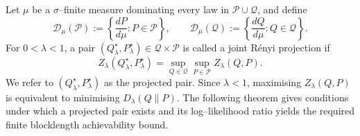 \documentclass[journal,12pt,draftclsnofoot,onecolumn]{IEEEtran}
\begin{document}
Let $\mu$ be a $\sigma$--finite measure dominating every law in $\mathcal P\cup\mathcal Q$, and define
\begin{equation*}
\mathcal D_\mu(\mathcal P) := \left\{\frac{dP}{d\mu}:P\in\mathcal P \right\},\qquad \mathcal D_\mu(\mathcal Q) := \left\{\frac{dQ}{d\mu}:Q\in\mathcal Q \right\}.
\end{equation*}
For $0<\lambda<1$, a pair $(Q_\lambda^\star,P_\lambda^\star)\in\mathcal Q\times\mathcal P$ is called a joint R\'enyi projection if
\begin{equation*}
Z_\lambda(Q_\lambda^\star,P_\lambda^\star) =\sup_{Q\in\mathcal Q} \sup_{P\in\mathcal P} Z_\lambda(Q,P).
\end{equation*}
We refer to $(Q_\lambda^\star,P_\lambda^\star)$ as the projected pair. Since $\lambda<1$, maximising $Z_\lambda(Q,P)$ is equivalent to minimising $D_\lambda(Q\|P)$. The following theorem gives conditions under which a projected pair exists and its log--likelihood ratio yields the required finite blocklength achievability bound.
\end{document}
